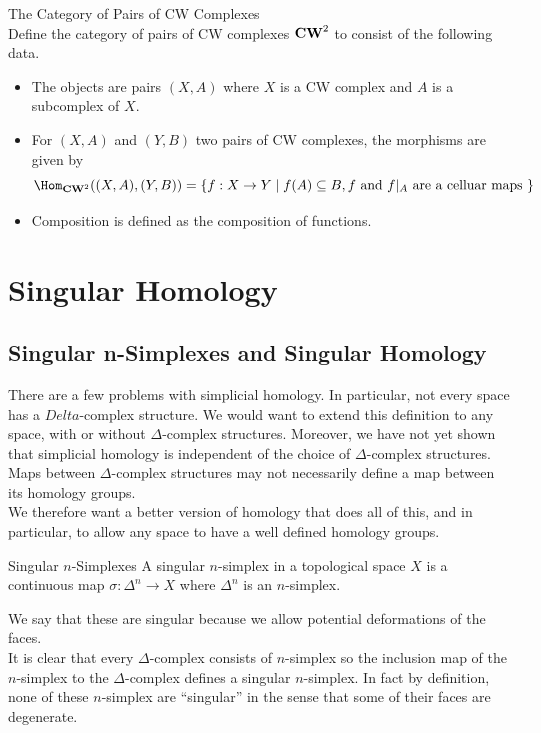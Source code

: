 \documentclass[a4paper]{article}
\begin{document}
\begin{defn}{The Category of Pairs of CW Complexes}{}\\
Define the category of pairs of CW complexes $\bold{CW}^2$ to consist of the following data. 
\begin{itemize}
\item The objects are pairs $(X,A)$ where $X$ is a CW complex and $A$ is a subcomplex of $X$. 
\item For $(X,A)$ and $(Y,B)$ two pairs of CW complexes, the morphisms are given by $$\Hom_{\bold{CW}^2}((X,A),(Y,B))=\{f:X\to Y\;|\;f(A)\subseteq B, f\text{ and }f|_A\text{ are a celluar maps }\}$$
\item Composition is defined as the composition of functions. 
\end{itemize}
\end{defn}


\pagebreak
\section{Singular Homology}
\subsection{Singular n-Simplexes and Singular Homology}
There are a few problems with simplicial homology. In particular, not every space has a $Delta$-complex structure. We would want to extend this definition to any space, with or without $\Delta$-complex structures. Moreover, we have not yet shown that simplicial homology is independent of the choice of $\Delta$-complex structures. Maps between $\Delta$-complex structures may not necessarily define a map between its homology groups. \\

We therefore want a better version of homology that does all of this, and in particular, to allow any space to have a well defined homology groups. 

\begin{defn}{Singular $n$-Simplexes}{} A singular $n$-simplex in a topological space $X$ is a continuous map $\sigma:\Delta^n\to X$ where $\Delta^n$ is an $n$-simplex. 
\end{defn}

We say that these are singular because we allow potential deformations of the faces. \\

It is clear that every $\Delta$-complex consists of $n$-simplex so the inclusion map of the $n$-simplex to the $\Delta$-complex defines a singular $n$-simplex. In fact by definition, none of these $n$-simplex are ``singular'' in the sense that some of their faces are degenerate. 
\end{document}
